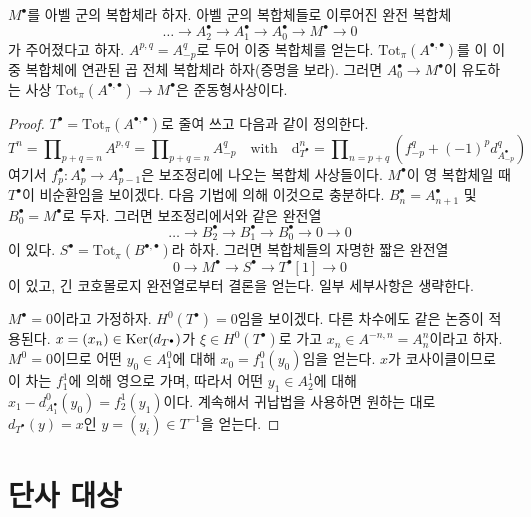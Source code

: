 \begin{lemma}
\label{lemma-resolution-gives-qis}
$M^\bullet$를 아벨 군의 복합체라 하자. 아벨 군의 복합체들로 이루어진
완전 복합체
$$
\ldots \to A_2^\bullet \to A_1^\bullet \to A_0^\bullet \to M^\bullet \to 0
$$
가 주어졌다고 하자. $A^{p, q} = A_{-p}^q$로 두어 이중 복합체를 얻는다.
$\text{Tot}_\pi(A^{\bullet, \bullet})$를 이 이중 복합체에 연관된 곱
전체 복합체라 하자(증명을 보라). 그러면 $A_0^\bullet \to M^\bullet$이
유도하는 사상 $\text{Tot}_\pi(A^{\bullet, \bullet}) \to M^\bullet$은
준동형사상이다.
\end{lemma}

\begin{proof}
$T^\bullet = \text{Tot}_\pi(A^{\bullet, \bullet})$로 줄여 쓰고 다음과
같이 정의한다.
$$
T^n = \prod\nolimits_{p + q = n} A^{p, q} =
\prod\nolimits_{p + q = n} A_{-p}^q
\quad\text{with}\quad
\text{d}_{T^\bullet}^n =
\prod\nolimits_{n = p + q} (f_{-p}^q + (-1)^pd_{A_{-p}^\bullet}^q)
$$
여기서 $f_p^\bullet : A_p^\bullet \to A_{p - 1}^\bullet$은 보조정리에
나오는 복합체 사상들이다. $M^\bullet$이 영 복합체일 때
$T^\bullet$이 비순환임을 보이겠다. 다음 기법에 의해 이것으로 충분하다.
$B_n^\bullet = A_{n + 1}^\bullet$ 및 $B_0^\bullet = M^\bullet$로 두자.
그러면 보조정리에서와 같은 완전열
$$
\ldots \to B_2^\bullet \to B_1^\bullet \to B_0^\bullet \to 0 \to 0
$$
이 있다. $S^\bullet = \text{Tot}_\pi(B^{\bullet, \bullet})$라 하자.
그러면 복합체들의 자명한 짧은 완전열
$$
0 \to M^\bullet \to S^\bullet \to T^\bullet[1] \to 0
$$
이 있고, 긴 코호몰로지 완전열로부터 결론을 얻는다. 일부 세부사항은
생략한다.

\medskip\noindent
$M^\bullet = 0$이라고 가정하자. $H^0(T^\bullet) = 0$임을 보이겠다.
다른 차수에도 같은 논증이 적용된다. $x =(x_n) \in \mathop{\mathrm{Ker}}(d_{T^\bullet})$가
$\xi \in H^0(T^\bullet)$로 가고 $x_n \in A^{-n, n} = A_n^n$이라고 하자.
$M^0 = 0$이므로 어떤 $y_0 \in A_1^0$에 대해
$x_0 = f_1^0(y_0)$임을 얻는다. $x$가 코사이클이므로
이 차는 $f_1^1$에 의해 영으로 가며, 따라서
어떤 $y_1 \in A_2^1$에 대해
$x_1 - d^0_{A_1^\bullet}(y_0) = f_2^1(y_1)$이다. 계속해서 귀납법을
사용하면 원하는 대로 $d_{T^\bullet}(y) = x$인
$y = (y_i) \in T^{-1}$을 얻는다.
\end{proof}

\section{단사 대상}
\label{section-injectives}


